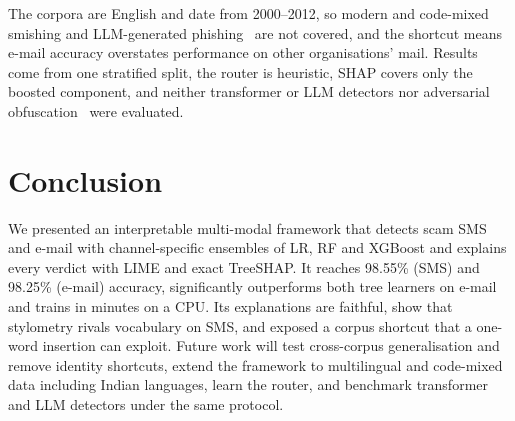 \documentclass[conference]{IEEEtran}
\begin{document}
The corpora are English and date from 2000--2012, so modern and code-mixed
smishing and LLM-generated phishing~\cite{opara2025evaluating} are not
covered, and the shortcut means e-mail accuracy overstates performance on
other organisations' mail. Results come from one stratified split, the router
is heuristic, SHAP covers only the boosted component, and neither transformer
or LLM detectors nor adversarial obfuscation~\cite{salman2024evasive} were
evaluated.

\section{Conclusion}\label{sec:conclusion}

We presented an interpretable multi-modal framework that detects scam SMS and
e-mail with channel-specific ensembles of LR, RF and XGBoost and explains every
verdict with LIME and exact TreeSHAP. It reaches 98.55\% (SMS) and 98.25\%
(e-mail) accuracy, significantly outperforms both tree learners on e-mail and
trains in minutes on a CPU. Its explanations are faithful, show that
stylometry rivals vocabulary on SMS, and exposed a corpus shortcut that a
one-word insertion can exploit. Future work will test cross-corpus
generalisation and remove identity shortcuts, extend the framework to
multilingual and code-mixed data including Indian languages, learn the
router, and benchmark transformer and LLM detectors under the same protocol.



\end{document}
